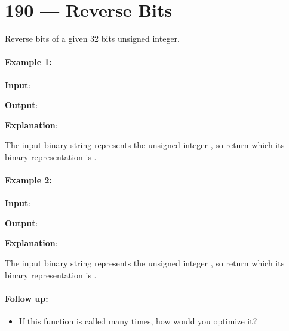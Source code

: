 \section{190 --- Reverse Bits}
Reverse bits of a given 32 bits unsigned integer.

\paragraph{Example 1:}
\begin{flushleft}


\textbf{Input}: 

\textbf{Output}: 

\textbf{Explanation}: 

The input binary string  represents the unsigned integer , so return  which its binary representation is .

\end{flushleft}

\paragraph{Example 2:}
\begin{flushleft}


\textbf{Input}: 

\textbf{Output}: 

\textbf{Explanation}: 

The input binary string  represents the unsigned integer , so return  which its binary representation is .
\end{flushleft} 


\paragraph{Follow up:}

\begin{itemize}
\item If this function is called many times, how would you optimize it?
\end{itemize}